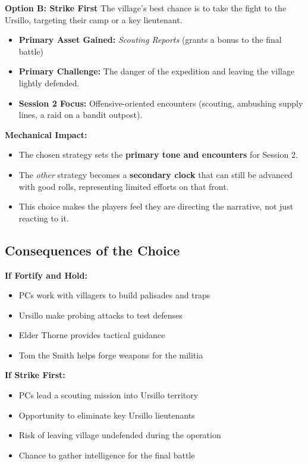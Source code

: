 \documentclass[11pt]{article}
\begin{document}
\textbf{Option B: Strike First}
The village's best chance is to take the fight to the Ursillo, targeting their camp or a key lieutenant.
\begin{itemize}
\item \textbf{Primary Asset Gained:} \textit{Scouting Reports} (grants a bonus to the final battle)
\item \textbf{Primary Challenge:} The danger of the expedition and leaving the village lightly defended.
\item \textbf{Session 2 Focus:} Offensive-oriented encounters (scouting, ambushing supply lines, a raid on a bandit outpost).
\end{itemize}

\textbf{Mechanical Impact:}
\begin{itemize}
\item The chosen strategy sets the \textbf{primary tone and encounters} for Session 2.
\item The \textit{other} strategy becomes a \textbf{secondary clock} that can still be advanced with good rolls, representing limited efforts on that front.
\item This choice makes the players feel they are directing the narrative, not just reacting to it.
\end{itemize}

\subsection{Consequences of the Choice}

\textbf{If Fortify and Hold:}
\begin{itemize}
\item PCs work with villagers to build palisades and traps
\item Ursillo make probing attacks to test defenses
\item Elder Thorne provides tactical guidance
\item Tom the Smith helps forge weapons for the militia
\end{itemize}

\textbf{If Strike First:}
\begin{itemize}
\item PCs lead a scouting mission into Ursillo territory
\item Opportunity to eliminate key Ursillo lieutenants
\item Risk of leaving village undefended during the operation
\item Chance to gather intelligence for the final battle
\end{itemize}
\end{document}
